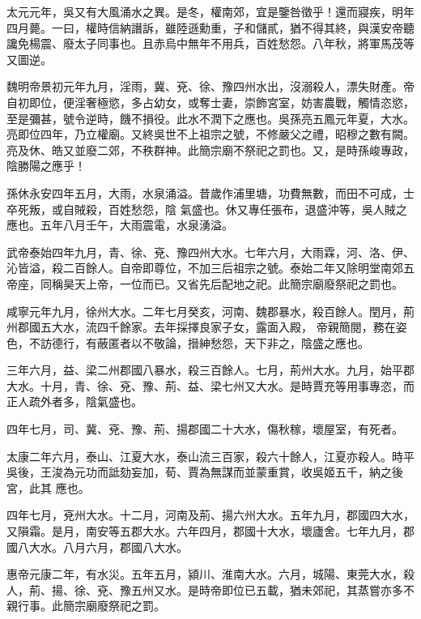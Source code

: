 \begin{pinyinscope}
 太元元年，吳又有大風涌水之異。是冬，權南郊，宜是鑒咎徵乎！還而寢疾，明年四月薨。一曰，權時信納譖訴，雖陸遜勳重，子和儲貳，猶不得其終，與漢安帝聽讒免楊震、廢太子同事也。且赤烏中無年不用兵，百姓愁怨。八年秋，將軍馬茂等又圖逆。



 魏明帝景初元年九月，淫雨，冀、兗、徐、豫四州水出，沒溺殺人，漂失財產。帝自初即位，便淫奢極慾，多占幼女，或奪士妻，崇飾宮室，妨害農戰，觸情恣慾，至是彌甚，號令逆時，饑不損役。此水不潤下之應也。吳孫亮五鳳元年夏，大水。亮即位四年，乃立權廟。又終吳世不上祖宗之號，不修嚴父之禮，昭穆之數有闕。亮及休、皓又並廢二郊，不秩群神。此簡宗廟不祭祀之罰也。又，是時孫峻專政，陰勝陽之應乎！



 孫休永安四年五月，大雨，水泉涌溢。昔歲作浦里塘，功費無數，而田不可成，士卒死叛，或自賊殺，百姓愁怨，陰
 氣盛也。休又專任張布，退盛沖等，吳人賊之應也。五年八月壬午，大雨震電，水泉湧溢。



 武帝泰始四年九月，青、徐、兗、豫四州大水。七年六月，大雨霖，河、洛、伊、沁皆溢，殺二百餘人。自帝即尊位，不加三后祖宗之號。泰始二年又除明堂南郊五帝座，同稱昊天上帝，一位而已。又省先后配地之祀。此簡宗廟廢祭祀之罰也。



 咸寧元年九月，徐州大水。二年七月癸亥，河南、魏郡暴水，殺百餘人。閏月，荊州郡國五大水，流四千餘家。去年採擇良家子女，露面入殿，
 帝親簡閱，務在姿色，不訪德行，有蔽匿者以不敬論，搢紳愁怨，天下非之，陰盛之應也。



 三年六月，益、梁二州郡國八暴水，殺三百餘人。七月，荊州大水。九月，始平郡大水。十月，青、徐、兗、豫、荊、益、梁七州又大水。是時賈充等用事專恣，而正人疏外者多，陰氣盛也。



 四年七月，司、冀、兗、豫、荊、揚郡國二十大水，傷秋稼，壞屋室，有死者。



 太康二年六月，泰山、江夏大水，泰山流三百家，殺六十餘人，江夏亦殺人。時平吳後，王浚為元功而詆劾妄加，荀、賈為無謀而並蒙重賞，收吳姬五千，納之後宮，此其
 應也。



 四年七月，兗州大水。十二月，河南及荊、揚六州大水。五年九月，郡國四大水，又隕霜。是月，南安等五郡大水。六年四月，郡國十大水，壞廬舍。七年九月，郡國八大水。八月六月，郡國八大水。



 惠帝元康二年，有水災。五年五月，潁川、淮南大水。六月，城陽、東莞大水，殺人，荊、揚、徐、兗、豫五州又水。是時帝即位已五載，猶未郊祀，其蒸嘗亦多不親行事。此簡宗廟廢祭祀之罰。




\end{pinyinscope}
